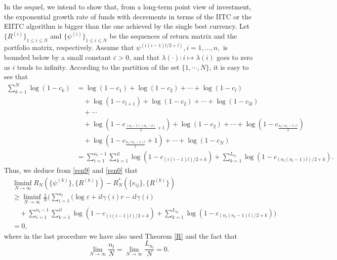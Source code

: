 \documentclass[11pt]{article}
\numberwithin{equation}{section}
\begin{document}
In the sequel, we intend to show that, from a long-term point view of investment, the exponential growth rate of funds with decrements in terms of the IITC or the EIITC algorithm is bigger  than the one achieved by the single best currency. Let $\{R^{(i)}\}_{1\le i\le N}$ and $\{\psi^{(i)}\}_{1\leq i \leq N}$ be the sequences of return matrix and the portfolio matrix, respectively. Assume that  $\psi^{(i(i-1)l/2+l)},i=1,...,n,$ is bounded below by a small constant  $\varepsilon >0 $, and that  $\lambda(\cdot):i\mapsto\lambda(i)$ goes to zero as $i$ tends to infinity.  
 According to the partition of the set $\{1,\cdots, N\}$, it is easy to see that 
\begin{equation}\label{ren0}
\begin{split}
\sum_{k=1}^{N}\log (1-c_k)&=\log (1-c_1)+\log (1-c_2)+\cdots+\log (1-c_l)\\
&\quad+\log (1-c_{l+1})+\log (1-c_2)+\cdots+\log (1-c_{3l})\\
&\quad+\cdots\\
&\quad+\log (1-c_{\frac{(n_l-1)(n_l-2)}{2}+1})+\log (1-c_2)+\cdots+\log (1-c_{\frac{n_l(n_l-1)l}{2}})\\
&\quad+\log (1-c_{\frac{n_l(n_l-1)l}{2}}+1)+\cdots+\log (1-c_N)\\
&=\sum_{i=1}^{n_l-1}\sum_{k=1}^{il}\log(1-c_{(i(i-1)l)/2+k})+\sum_{k=1}^{L_{n_l}}\log(1-c_{(n_l(n_l-1)l)/2+k}).
\end{split}
\end{equation}
Thus, we deduce from \eqref{ren9} and \eqref{ren0} that 
\begin{equation} \label{re}
\begin{split}
&\liminf_{N\rightarrow\infty} R_N(\{\psi^{(k)}\},\{R^{(k)}\})-R_N^*(\{e_{ij}\},\{R^{(k)}\})\\
&\ge\liminf_{N\rightarrow\infty} \frac{1}{N}\Big(\sum_{i=1}^{n_l}\Big(\log\varepsilon+il\gamma(i)r-il\gamma(i)\\
&\quad+\sum_{i=1}^{n_l-1}\sum_{k=1}^{il}\log(1-c_{(i(i-1)l)/2+k})+\sum_{k=1}^{L_{n_l}}\log(1-c_{(n_l(n_l-1)l)/2+k})\Big) \\
&=0,
\end{split}
\end{equation}
where in the last procedure we have also used Theorem \ref{R} and the fact that \begin{equation*}\lim_{N\rightarrow \infty}\frac{n_l}{N}=\lim_{N\rightarrow \infty}\frac{L_{n_l}}{N}=0.\end{equation*}
  
\end{document}
